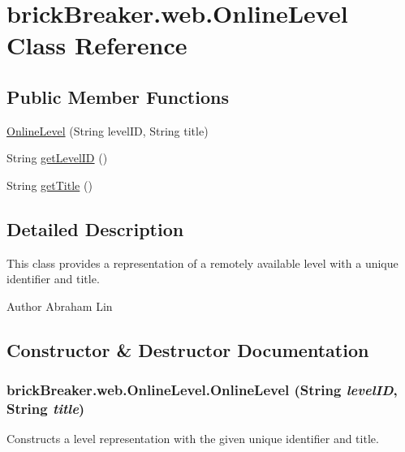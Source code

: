 \hypertarget{classbrick_breaker_1_1web_1_1_online_level}{
\section{brickBreaker.web.OnlineLevel Class Reference}
\label{classbrick_breaker_1_1web_1_1_online_level}
}
\subsection*{Public Member Functions}
\begin{DoxyCompactItemize}
\item 
\hyperlink{classbrick_breaker_1_1web_1_1_online_level_a3d31cb97e69deb979c586a78872beac5}{OnlineLevel} (String levelID, String title)
\item 
String \hyperlink{classbrick_breaker_1_1web_1_1_online_level_a265cd345985cde1aa244cb739445bbc3}{getLevelID} ()
\item 
String \hyperlink{classbrick_breaker_1_1web_1_1_online_level_a0a23b746281c6b60e88dab532ab77df4}{getTitle} ()
\end{DoxyCompactItemize}


\subsection{Detailed Description}
This class provides a representation of a remotely available level with a unique identifier and title.

\begin{DoxyAuthor}{Author}
Abraham Lin 
\end{DoxyAuthor}


\subsection{Constructor \& Destructor Documentation}
\hypertarget{classbrick_breaker_1_1web_1_1_online_level_a3d31cb97e69deb979c586a78872beac5}{
\subsubsection[{OnlineLevel}]{\setlength{\rightskip}{0pt plus 5cm}brickBreaker.web.OnlineLevel.OnlineLevel (String {\em levelID}, \/  String {\em title})}}
\label{classbrick_breaker_1_1web_1_1_online_level_a3d31cb97e69deb979c586a78872beac5}
Constructs a level representation with the given unique identifier and title.


